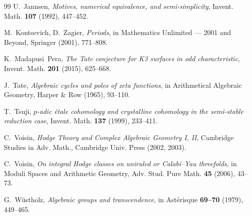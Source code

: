 \documentclass[11pt]{article}
\theoremstyle{definition}
\begin{document}
\begin{thebibliography}{99}
U.~Jannsen,
\textit{Motives, numerical equivalence, and semi-simplicity},
Invent. Math. \textbf{107} (1992), 447--452.

M.~Kontsevich, D.~Zagier,
\textit{Periods},
in Mathematics Unlimited --- 2001 and Beyond,
Springer (2001), 771--808.

K.~Madapusi~Pera,
\textit{The Tate conjecture for K3 surfaces in odd characteristic},
Invent. Math. \textbf{201} (2015), 625--668.

J.~Tate,
\textit{Algebraic cycles and poles of zeta functions},
in Arithmetical Algebraic Geometry, Harper \& Row (1965), 93--110.

T.~Tsuji,
\textit{$p$-adic \'etale cohomology and crystalline cohomology
in the semi-stable reduction case},
Invent. Math. \textbf{137} (1999), 233--411.

C.~Voisin,
\textit{Hodge Theory and Complex Algebraic Geometry I, II},
Cambridge Studies in Adv. Math., Cambridge Univ. Press (2002, 2003).

C.~Voisin,
\textit{On integral Hodge classes on uniruled or Calabi--Yau threefolds},
in Moduli Spaces and Arithmetic Geometry,
Adv. Stud. Pure Math. \textbf{45} (2006), 43--73.

G.~W\"ustholz,
\textit{Algebraic groups and transcendence},
in Ast\'erisque \textbf{69--70} (1979), 449--465.

\end{thebibliography}
\end{document}
